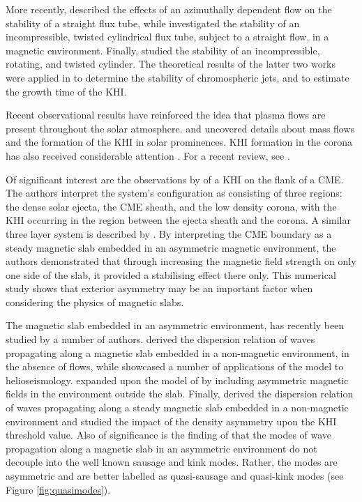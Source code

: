 \documentclass[12pt]{ociamthesis}
\begin{document}
More recently, \cite{Soler2010} described the effects of an azimuthally dependent flow on the stability of a straight flux tube, while \cite{Zaqarashvili2014a} investigated the stability of an incompressible, twisted cylindrical flux tube, subject to a straight flow, in a magnetic environment.
Finally, \cite{Zaqarashvili2015} studied the stability of an incompressible, rotating, and twisted cylinder.
The theoretical results of the latter two works were applied in \cite{Kuridze2016} to determine the stability of chromospheric jets, and to estimate the growth time of the KHI.

Recent observational results have reinforced the idea that plasma flows are present throughout the solar atmosphere.
\cite{Berger2010} and \cite{Ryutova2010} uncovered details about mass flows and the formation of the KHI in solar prominences.
KHI formation in the corona has also received considerable attention \citep[see][]{Foullon2011, Ofman2011, Foullon2013}.
For a recent review, see \cite{Zhelyazkov2015}.

Of significant interest are the observations by \cite{Foullon2011} of a KHI on the flank of a CME.
The authors interpret the system's configuration as consisting of three regions: the dense solar ejecta, the CME sheath, and the low density corona, with the KHI occurring in the region between the ejecta sheath and the corona.
A similar three layer system is described by \cite{Mostl2013}.
By interpreting the CME boundary as a steady magnetic slab embedded in an asymmetric magnetic environment, the authors demonstrated that through increasing the magnetic field strength on only one side of the slab, it provided a stabilising effect there only.
This numerical study shows that exterior asymmetry may be an important factor when considering the physics of magnetic slabs.

The magnetic slab embedded in an asymmetric environment, has recently been studied by a number of authors.
\cite{Allcock2017} derived the dispersion relation of waves propagating along a magnetic slab embedded in a non-magnetic environment, in the absence of flows, while \cite{Allcock2018} showcased a number of applications of the model to helioseismology.
\cite{Zsamberger2018} expanded upon the model of \cite{Allcock2017} by including asymmetric magnetic fields in the environment outside the slab.
Finally, \cite{Barbulescu2018} derived the dispersion relation of waves propagating along a steady magnetic slab embedded in a non-magnetic environment and studied the impact of the density asymmetry upon the KHI threshold value.
Also of significance is the finding of \cite{Allcock2017} that the modes of wave propagation along a magnetic slab in an asymmetric environment do not decouple into the well known sausage and kink modes.
Rather, the modes are asymmetric and are better labelled as quasi-sausage and quasi-kink modes (see Figure \ref{fig:quasimodes}).
\end{document}
